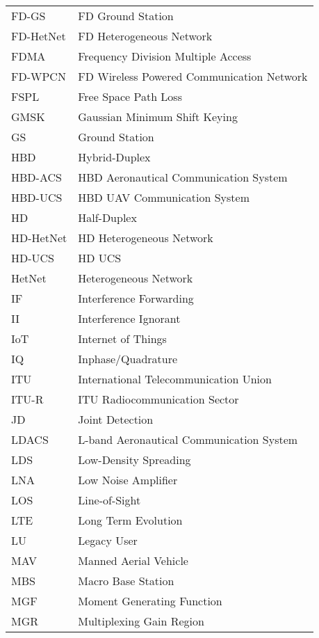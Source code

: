 \begin{longtable}{ll}
FD-GS	&	FD Ground Station																\\
FD-HetNet &	FD Heterogeneous Network										\\
FDMA	&	Frequency Division Multiple Access							\\
FD-WPCN	&	FD Wireless Powered Communication Network			\\
FSPL	&	Free Space Path Loss 														\\
GMSK	&	Gaussian Minimum Shift Keying 									\\
GS		&	Ground Station																	\\
HBD		&	Hybrid-Duplex																		\\
HBD-ACS	&	HBD Aeronautical Communication System					\\
HBD-UCS	&	HBD UAV Communication System									\\
HD		&	Half-Duplex																			\\
HD-HetNet	&	HD Heterogeneous Network										\\
HD-UCS	&	HD UCS																				\\
HetNet	&	Heterogeneous Network													\\
IF		&	Interference Forwarding													\\
II		&	Interference Ignorant														\\
IoT		&	Internet of Things															\\
IQ		&	Inphase/Quadrature															\\
ITU		&	International Telecommunication Union						\\
ITU-R	&	ITU Radiocommunication Sector										\\
JD		&	Joint Detection																	\\
LDACS	&	L-band Aeronautical Communication System				\\
LDS		&	Low-Density Spreading														\\
LNA		&	Low Noise Amplifier															\\
LOS		&	Line-of-Sight																		\\
LTE		&	Long Term Evolution															\\
LU		&	Legacy User																			\\
MAV		&	Manned Aerial Vehicle														\\
MBS		&	Macro Base Station															\\
MGF		&	Moment Generating Function											\\
MGR		&	Multiplexing Gain Region												\\

\end{longtable}
